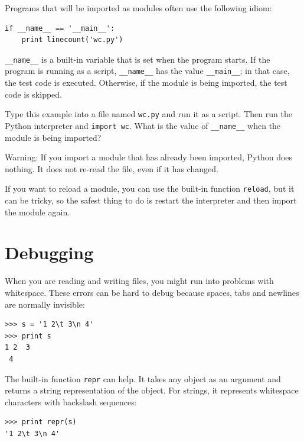 \documentclass[10pt]{book}
\begin{document}
\begin{CJK}{UTF8}{gbsn}
Programs that will be imported as modules often
use the following idiom:

\begin{verbatim}
if __name__ == '__main__':
    print linecount('wc.py')
\end{verbatim}
%
\verb"__name__" is a built-in variable that is set when the
program starts.  If the program is running as a script,
\verb"__name__" has the value \verb"__main__"; in that
case, the test code is executed.  Otherwise,
if the module is being imported, the test code is skipped.

\begin{exercise}

Type this example into a file named {\tt wc.py} and run
it as a script.  Then run the Python interpreter and
{\tt import wc}.  What is the value of \verb"__name__"
when the module is being imported?

Warning: If you import a module that has already been imported,
Python does nothing.  It does not re-read the file, even if it has
changed.

If you want to reload a module, you can use the built-in function 
{\tt reload}, but it can be tricky, so the safest thing to do is
restart the interpreter and then import the module again.

\end{exercise}



\section{Debugging}

When you are reading and writing files, you might run into problems
with whitespace.  These errors can be hard to debug because spaces,
tabs and newlines are normally invisible:

\begin{verbatim}
>>> s = '1 2\t 3\n 4'
>>> print s
1 2	 3
 4
\end{verbatim}

The built-in function {\tt repr} can help.  It takes any object as an
argument and returns a string representation of the object.  For
strings, it represents whitespace
characters with backslash sequences:

\begin{verbatim}
>>> print repr(s)
'1 2\t 3\n 4'
\end{verbatim}


\end{CJK}
\end{document}
